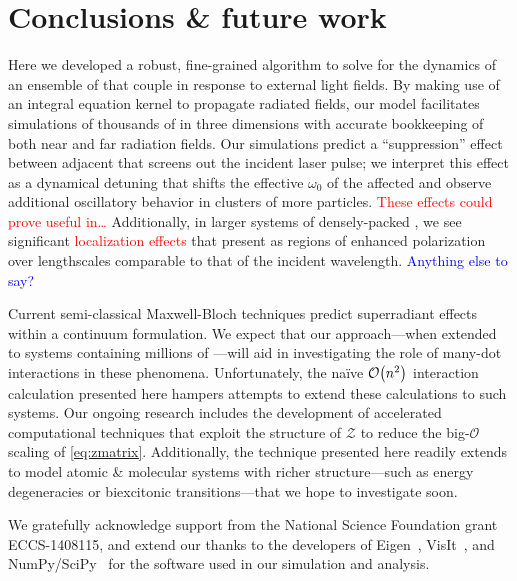 \section{\label{section:conclusion}Conclusions \& future work}
Here we developed a robust, fine-grained algorithm to solve for the dynamics of an ensemble of \qds{} that couple in response to external light fields.
By making use of an integral equation kernel to propagate radiated fields, our model facilitates simulations of thousands of \qds{} in three dimensions with accurate bookkeeping of both near and far radiation fields.
Our simulations predict a ``suppression'' effect between adjacent \qds{} that screens out the incident laser pulse;
we interpret this effect as a dynamical detuning that shifts the effective $\omega_0$ of the affected \qds{} and observe additional oscillatory behavior in clusters of more particles.
\textcolor{red}{These effects could prove useful in\ldots}
Additionally, in larger systems of densely-packed \qds{}, we see significant \textcolor{red}{localization effects} that present as regions of enhanced polarization over lengthscales comparable to that of the incident wavelength.
\textcolor{blue}{Anything else to say?}


Current semi-classical Maxwell-Bloch techniques predict superradiant effects~\cite{Gross1982} within a continuum formulation.
We expect that our approach---when extended to systems containing millions of \qds{}---will aid in investigating the role of many-dot interactions in these phenomena.
Unfortunately, the na\"ive $\mathcal{O}\qty(n^2)$ interaction calculation presented here hampers attempts to extend these calculations to such systems.
Our ongoing research includes the development of accelerated computational techniques that exploit the structure of $\mathcal{Z}$ to reduce the big-$\mathcal{O}$ scaling of \cref{eq:zmatrix}.
Additionally, the technique presented here readily extends to model atomic \& molecular systems with richer structure---such as energy degeneracies or biexcitonic transitions---that we hope to investigate soon.

\acknowledgments
We gratefully acknowledge support from the National Science Foundation grant ECCS-1408115, and extend our thanks to the developers of
Eigen~\cite{Eigen}, VisIt~\cite{VisIt}, and NumPy/SciPy~\cite{NumPy,SciPy} for the software used in our simulation and analysis.
